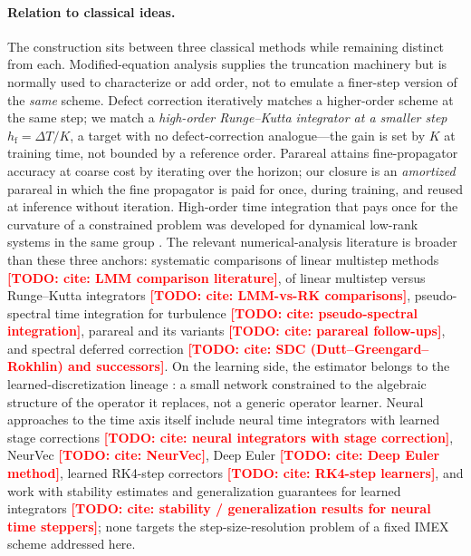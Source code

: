 \documentclass[11pt]{article}
\theoremstyle{plain}
\theoremstyle{definition}
\newcommand{\TODO}[1]{\textcolor{red}{\textbf{[TODO: #1]}}}
\newcommand{\DT}{\Delta T}
\newcommand{\hf}{h_{\mathrm{f}}}
\begin{document}
\paragraph{Relation to classical ideas.}
The construction sits between three classical methods while remaining distinct
from each. Modified-equation analysis \citep{warming1974} supplies the
truncation machinery but is normally used to characterize or add order, not to
emulate a finer-step version of the \emph{same} scheme. Defect correction
\citep{stetter1978} iteratively matches a higher-order scheme at the same
step; we match a \emph{high-order Runge--Kutta integrator at a smaller step}
$\hf=\DT/K$, a target with no defect-correction analogue---the gain is set by
$K$ at training time, not bounded by a reference order. Parareal \citep{lions2001} attains
fine-propagator accuracy at coarse cost by iterating over the horizon; our
closure is an \emph{amortized} parareal in which the fine propagator is paid
for once, during training, and reused at inference without iteration.
High-order time integration that pays once for the curvature of a constrained
problem was developed for dynamical low-rank systems in the same group
\citep{charous2023}. The relevant numerical-analysis literature is broader
than these three anchors: systematic comparisons of linear multistep methods
\TODO{cite: LMM comparison literature}, of linear multistep versus
Runge--Kutta integrators \TODO{cite: LMM-vs-RK comparisons}, pseudo-spectral
time integration for turbulence \TODO{cite: pseudo-spectral integration},
parareal and its variants \TODO{cite: parareal follow-ups}, and spectral
deferred correction \TODO{cite: SDC (Dutt--Greengard--Rokhlin) and successors}.
On the learning side, the estimator belongs to the
learned-discretization lineage \citep{barsinai2019,kochkov2021}: a small
network constrained to the algebraic structure of the operator it replaces,
not a generic operator learner. Neural approaches to the time axis itself
include neural time integrators with learned stage corrections \TODO{cite:
neural integrators with stage correction}, NeurVec \TODO{cite: NeurVec},
Deep Euler \TODO{cite: Deep Euler method}, learned RK4-step correctors
\TODO{cite: RK4-step learners}, and work with stability estimates and
generalization guarantees for learned integrators \TODO{cite: stability /
generalization results for neural time steppers}; none targets the
step-size-resolution problem of a fixed IMEX scheme addressed here.
\end{document}
